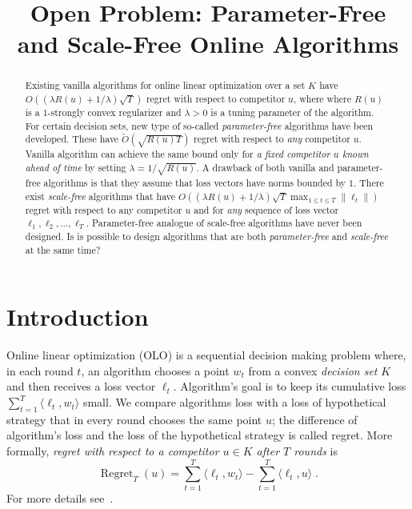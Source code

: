\documentclass{colt2016} %
\title{Open Problem: Parameter-Free and Scale-Free Online Algorithms}
\DeclareMathOperator{\Regret}{Regret}
\newcommand{\norm}[1]{\left\|{#1}\right\|}
\begin{document}
\maketitle

\begin{abstract}
Existing vanilla algorithms for online linear optimization over a set $K$ have
$O((\lambda R(u) + 1/\lambda) \sqrt{T})$ regret with respect to  competitor $u$,
where where $R(u)$ is a $1$-strongly convex regularizer and $\lambda > 0$ is a
tuning parameter of the algorithm. For certain decision sets, new type of
so-called \emph{parameter-free} algorithms have been developed. These have
$\widetilde O(\sqrt{R(u) T})$ regret with respect to \emph{any} competitor $u$.
Vanilla algorithm can achieve the same bound only for \emph{a fixed competitor
$u$ known ahead of time} by setting $\lambda = 1/\sqrt{R(u)}$. A drawback of
both vanilla and parameter-free algorithms is that they assume that loss vectors
have norms bounded by $1$. There exist \emph{scale-free} algorithms that have
$O((\lambda R(u) + 1/\lambda) \sqrt{T} \max_{1 \le t \le T} \norm{\ell_t})$
regret with respect to any competitor $u$ and for \emph{any} sequence of loss
vector $\ell_1, \ell_2, \dots, \ell_T$. Parameter-free analogue of scale-free
algorithms have never been designed. Is is possible to design algorithms that
are both \emph{parameter-free} and \emph{scale-free} at the same time?
\end{abstract}

\section{Introduction}

Online linear optimization (OLO) is a sequential decision making problem where,
in each round $t$, an algorithm chooses a point $w_t$ from a convex
\emph{decision set} $K$ and then receives a loss vector $\ell_t$. Algorithm's
goal is to keep its cumulative loss $\sum_{t=1}^T \langle \ell_t, w_t \rangle$
small. We compare algorithms loss with a loss of hypothetical strategy that in
every round chooses the same point $u$; the difference of algorithm's  loss and
the loss of the hypothetical strategy is called regret. More formally,
\emph{regret with respect to a competitor $u \in K$ after $T$ rounds} is
$$
\Regret_T(u) = \sum_{t=1}^T \langle \ell_t, w_t \rangle - \sum_{t=1}^T \langle \ell_t, u \rangle \; .
$$
For more details see~\cite{Cesa-Bianchi-Lugosi-2006, Shalev-Shwartz-2011}.
\end{document}
